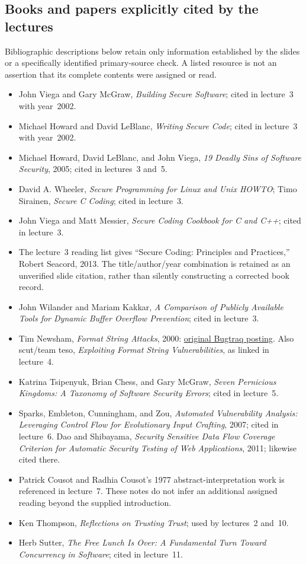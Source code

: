 \documentclass[11pt,a4paper]{article}
\numberwithin{figure}{section}
\begin{document}
\subsection{Books and papers explicitly cited by the lectures}
Bibliographic descriptions below retain only information established by the slides or a specifically identified primary-source check. A listed resource is not an assertion that its complete contents were assigned or read.
\begin{itemize}
\item John Viega and Gary McGraw, \emph{Building Secure Software}; cited in lecture~3 with year~2002.
\item Michael Howard and David LeBlanc, \emph{Writing Secure Code}; cited in lecture~3 with year~2002.
\item Michael Howard, David LeBlanc, and John Viega, \emph{19 Deadly Sins of Software Security}, 2005; cited in lectures~3 and~5.
\item David A. Wheeler, \emph{Secure Programming for Linux and Unix HOWTO}; Timo Sirainen, \emph{Secure C Coding}; cited in lecture~3.
\item John Viega and Matt Messier, \emph{Secure Coding Cookbook for C and C++}; cited in lecture~3.
\item The lecture~3 reading list gives ``Secure Coding: Principles and Practices,'' Robert Seacord, 2013. The title/author/year combination is retained as an unverified slide citation, rather than silently constructing a corrected book record.
\item John Wilander and Mariam Kakkar, \emph{A Comparison of Publicly Available Tools for Dynamic Buffer Overflow Prevention}; cited in lecture~3.
\item Tim Newsham, \emph{Format String Attacks}, 2000: \href{https://seclists.org/bugtraq/2000/Sep/214}{original Bugtraq posting}. Also scut/team teso, \emph{Exploiting Format String Vulnerabilities}, as linked in lecture~4.
\item Katrina Tsipenyuk, Brian Chess, and Gary McGraw, \emph{Seven Pernicious Kingdoms: A Taxonomy of Software Security Errors}; cited in lecture~5.
\item Sparks, Embleton, Cunningham, and Zou, \emph{Automated Vulnerability Analysis: Leveraging Control Flow for Evolutionary Input Crafting}, 2007; cited in lecture~6. Dao and Shibayama, \emph{Security Sensitive Data Flow Coverage Criterion for Automatic Security Testing of Web Applications}, 2011; likewise cited there.
\item Patrick Cousot and Radhia Cousot's 1977 abstract-interpretation work is referenced in lecture~7. These notes do not infer an additional assigned reading beyond the supplied introduction.
\item Ken Thompson, \emph{Reflections on Trusting Trust}; used by lectures~2 and~10.
\item Herb Sutter, \emph{The Free Lunch Is Over: A Fundamental Turn Toward Concurrency in Software}; cited in lecture~11.
\end{itemize}
\end{document}
